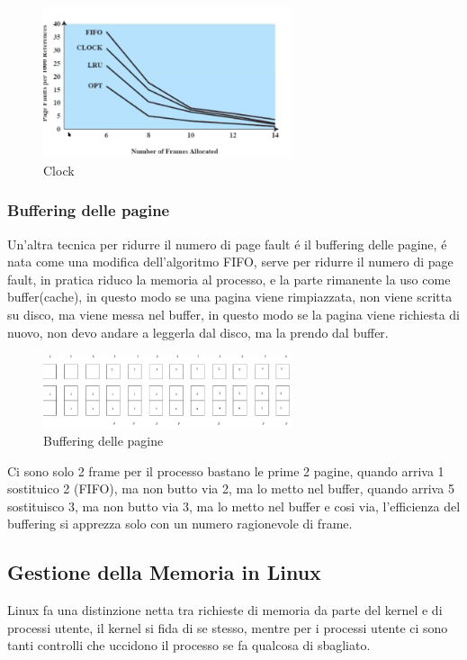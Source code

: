     \begin{figure}[H]
        \centering
        \includegraphics[width=0.65\textwidth]{immagini/ConfrontoTraAlgoritmiSostituzione}
        \caption{Clock}
    \end{figure}
    \subsubsection*{Buffering delle pagine}
    Un'altra tecnica per ridurre il numero di page fault é il buffering delle pagine, é nata come una modifica dell'algoritmo
    FIFO, serve per ridurre il numero di page fault, in pratica riduco la memoria al processo, e la parte rimanente la uso
    come buffer(cache), in questo modo se una pagina viene rimpiazzata, non viene scritta su disco, ma viene messa nel buffer,
    in questo modo se la pagina viene richiesta di nuovo, non devo andare a leggerla dal disco, ma la prendo dal buffer.
    \begin{figure}[H]
        \centering
        \includegraphics[width=0.65\textwidth]{immagini/AlgoritmoSostituzioneBufferingDellePagine}
        \caption{Buffering delle pagine}
    \end{figure}
    Ci sono solo 2 frame per il processo bastano le prime 2 pagine, quando arriva 1 sostituico 2 (FIFO), ma non butto via
    2, ma lo metto nel buffer, quando arriva 5 sostituisco 3, ma non butto via 3, ma lo metto nel buffer e cosi via, l'efficienza
    del buffering si apprezza solo con un numero ragionevole di frame.
    \subsection{Gestione della Memoria in Linux}
    Linux fa una distinzione netta tra richieste di memoria da parte del kernel e di processi utente, il kernel si fida di
    se stesso, mentre per i processi utente ci sono tanti controlli che uccidono il processo se fa qualcosa di sbagliato.

